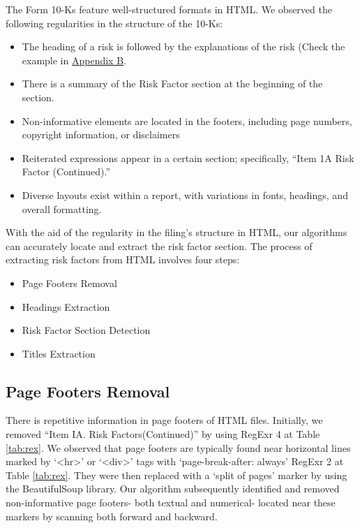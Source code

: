 \documentclass[logo,bsc,singlespacing,parskip]{infthesis}
\begin{document}
The Form 10-Ks feature well-structured formats in HTML. We observed the following regularities in the structure of the 10-Ks:
\begin{itemize}
    \item The heading of a risk is followed by the explanations of the risk (Check the example in \hyperref[appendix_nvidia_10-k]{Appendix B}.
    \item There is a summary of the Risk Factor section at the beginning of the section.
    \item Non-informative elements are located in the footers, including page numbers, copyright information, or disclaimers
    \item Reiterated expressions appear in a certain section; specifically, “Item 1A Risk Factor (Continued).”
    \item Diverse layouts exist within a report, with variations in fonts, headings, and overall formatting.

\end{itemize}
With the aid of the regularity in the filing’s structure in HTML, our algorithms can accurately locate and extract the risk factor section. The process of extracting risk factors from HTML involves four steps: 
\begin{itemize}
    \item Page Footers Removal
    \item Headings Extraction
    \item Risk Factor Section Detection
    \item Titles Extraction
\end{itemize}

\subsection{Page Footers Removal}

There is repetitive information in page footers of HTML files. Initially, we removed “Item IA. Risk Factors(Continued)” by using RegExr 4 at Table \ref{tab:rex}. We observed that page footers are typically found near horizontal lines marked by ‘\textless hr\textgreater’ or ‘\textless div\textgreater’ tags with ‘page-break-after: always’ RegExr 2 at Table \ref{tab:rex}. They were then replaced with a ‘split of pages’ marker by using the BeautifulSoup library. Our algorithm subsequently identified and removed non-informative page footers- both textual and numerical- located near these markers by scanning both forward and backward. 
\end{document}
